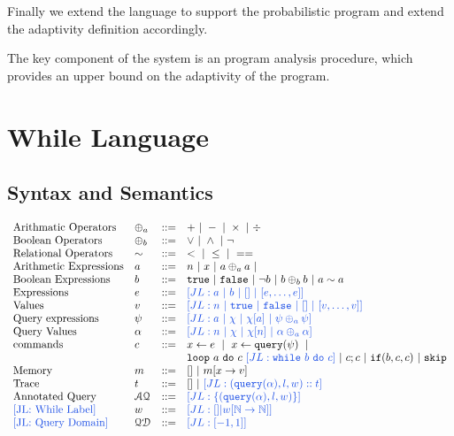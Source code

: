 \documentclass[a4paper,11pt]{article}
\begin{document}
Finally we extend the language to support the probabilistic program and extend the adaptivity definition accordingly.


The key component of the system is an program analysis procedure, which provides an upper bound on the adaptivity of the program.

\section{While Language}
%
\subsection{Syntax and Semantics}
%
\[
\begin{array}{llll}
 \mbox{Arithmatic Operators} & \oplus_a & ::= & + ~|~ - ~|~ \times 
%
~|~ \div \\  
  \mbox{Boolean Operators} & \oplus_b & ::= & \lor ~|~ \land ~|~ \neg\\
   \mbox{Relational Operators} & \sim & ::= & < ~|~ \leq ~|~ == \\  
\mbox{Arithmetic Expressions} & \aexpr & ::= & 
	n ~|~ x ~|~ \aexpr \oplus_a \aexpr ~|~ \\
\mbox{Boolean Expressions} & \bexpr & ::= & 
	\etrue ~|~ \efalse  ~|~ \neg \bexpr
	 ~|~ \bexpr \oplus_b \bexpr
	~|~ \aexpr \sim \aexpr \\
\mbox{Expressions } & \expr & ::= & \jl{\aexpr \sep \bexpr ~|~ [] ~|~ [\expr, \dots, \expr]} \\
\mbox{Values } & v & ::= & \jl{ n \sep \etrue \sep \efalse ~|~ [] ~|~ [v, \dots, v]}  
\\
\mbox{Query expressions} & \qexpr & ::= 
& \jl{ \aexpr ~|~ \chi ~|~ \chi[\aexpr] ~|~ \qexpr \oplus_a \qexpr} 
\\
\mbox{Query Values} & \qval & ::= 
& \jl{ n ~|~ \chi ~|~ \chi[n] ~|~ \qval \oplus_a  \qval }
\\
\mbox{commands} & c & ::= &   \assign x \expr ~|~  \assign{x}{ \query(\qexpr)}
%
~|~ \\ 
&&& \eloop ~ \aexpr  ~ \edo ~ c ~ \jl{\ewhile ~ b ~ \edo ~ c}  ~|~ c;c  ~|~ \eif(\bexpr, c, c) 	 ~|~ \eskip 
	\\
\mbox{Memory} & m & ::= & [] ~|~ m[x \to v] \\
\mbox{Trace} & t & ::= & [] 
~|~ \jl{{( \query(\qval), l, w) :: t}} \\
%
\mbox{Annotated Query} & \mathcal{AQ}  & 
::= & \jl{\{( \query(\qval), l, w) \} } 
\\
%
\mbox{\jl{While Label}}
& w & ::= & \jl{[] |  w[\mathbb{N} \to \mathbb{N}]}
\\
%
\mbox{\jl{Query Domain}}
& \qdom & ::= & \jl{[-1,1]}
\end{array}
\]
%
\end{document}
